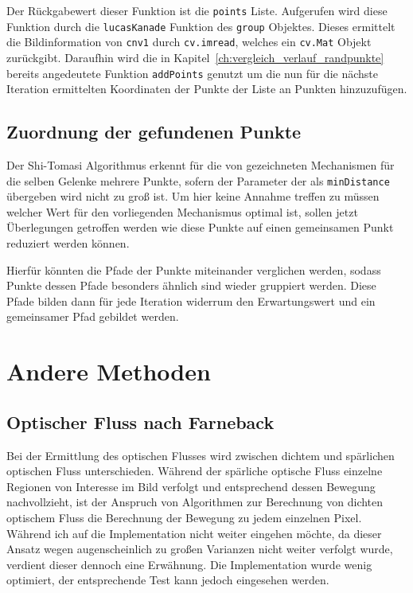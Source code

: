 Der Rückgabewert dieser Funktion ist die \lstinline{points} Liste.
Aufgerufen wird diese Funktion durch die \lstinline{lucasKanade} Funktion des \lstinline{group} Objektes.
Dieses ermittelt die Bildinformation von \lstinline{cnv1} durch \lstinline{cv.imread}, welches ein \lstinline{cv.Mat} Objekt zurückgibt.
Daraufhin wird die in Kapitel~\ref{ch:vergleich_verlauf_randpunkte} bereits angedeutete Funktion \lstinline{addPoints} genutzt um die nun für die nächste Iteration ermittelten Koordinaten der Punkte der Liste an Punkten hinzuzufügen.

\subsection{Zuordnung der gefundenen Punkte}

Der Shi-Tomasi Algorithmus erkennt für die von  gezeichneten Mechanismen für die selben Gelenke mehrere Punkte, sofern der Parameter der als \lstinline{minDistance} übergeben wird nicht zu groß ist.
Um hier keine Annahme treffen zu müssen welcher Wert für den vorliegenden Mechanismus optimal ist, sollen jetzt Überlegungen getroffen werden wie diese Punkte auf einen gemeinsamen Punkt reduziert werden können.

Hierfür könnten die Pfade der Punkte miteinander verglichen werden, sodass Punkte dessen Pfade besonders ähnlich sind wieder gruppiert werden.
Diese Pfade bilden dann für jede Iteration widerrum den Erwartungswert und ein gemeinsamer Pfad gebildet werden.


\section{Andere Methoden}

\subsection{Optischer Fluss nach Farneback}

Bei der Ermittlung des optischen Flusses wird zwischen dichtem und spärlichen optischen Fluss unterschieden.
Während der spärliche optische Fluss einzelne Regionen von Interesse im Bild verfolgt und entsprechend dessen Bewegung nachvollzieht, ist der Anspruch von Algorithmen zur Berechnung von dichten optischem Fluss die Berechnung der Bewegung zu jedem einzelnen Pixel.
Während ich auf die Implementation nicht weiter eingehen möchte, da dieser Ansatz wegen augenscheinlich zu großen Varianzen nicht weiter verfolgt wurde, verdient dieser dennoch eine Erwähnung.
Die Implementation wurde wenig optimiert, der entsprechende Test kann jedoch eingesehen werden.

